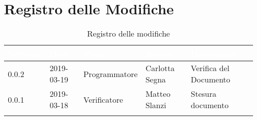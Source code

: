 \newpage

\section*{Registro delle Modifiche}

\begin{center}
\begin{longtable}[c]{|m{}|m{}|m{}|m{}|p{}|}
\hline
\rowcolor{bluelogo}\textbf{\textcolor{white}{Versione}} & \textbf{\textcolor{white}{Data}} & \textbf{\textcolor{white}{Ruolo}} & \textbf{\textcolor{white}{Autore}} & \textbf{\textcolor{white}{Descrizione}}\\
\hline \hline
\endfirsthead
\rowcolor{grigio} 0.0.2 & 2019-03-19 & Programmatore & Carlotta Segna & Verifica del Documento \\
\hline
0.0.1 & 2019-03-18 & Verificatore & Matteo Slanzi & Stesura documento \\
\hline
\caption{Registro delle modifiche}
\end{longtable}
\end{center}

